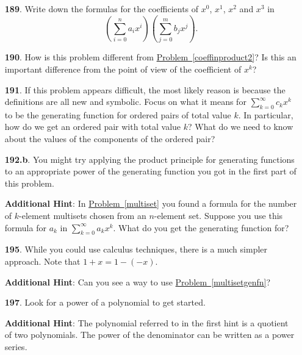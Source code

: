 \documentclass[10pt,]{book}
\theoremstyle{plain}
\theoremstyle{definition}
\theoremstyle{definition}
\numberwithin{equation}{chapter}
\begin{document}
\begin{itemize}[itemsep=1em]
\item[\textbf{189}.]Write down the formulas for the coefficients of \(x^0\), \(x^1\), \(x^2\) and \(x^3\) in%
\begin{equation*}
\left(\sum_{i=0}^n a_ix^i\right)\left(\sum_{j=0}^m b_jx^j\right)\text{.}
\end{equation*}
%

\item[\textbf{190}.]How is this problem different from \hyperref[coeffinproduct2]{Problem~\ref{coeffinproduct2}}? Is this an important difference from the point of view of the coefficient of \(x^k\)?%

\item[\textbf{191}.]If this problem appears difficult, the most likely reason is because the definitions are all new and symbolic. Focus on what it means for \(\sum_{k=0}^\infty c_kx^k\) to be the generating function for ordered pairs of total value \(k\). In particular, how do we get an ordered pair with total value \(k\)? What do we need to know about the values of the components of the ordered pair?%

\item[\textbf{192.b}.]You might try applying the product principle for generating functions to an appropriate power of the generating function you got in the first part of this problem.%

\par\smallskip
\noindent\textbf{Additional Hint}: In \hyperref[multiset]{Problem~\ref{multiset}} you found a formula for the number of \(k\)-element multisets chosen from an \(n\)-element set. Suppose you use this formula for \(a_k\) in \(\sum_{k=0}^\infty a_kx^k\). What do you get the generating function for?%

\item[\textbf{195}.]While you could use calculus techniques, there is a much simpler approach. Note that \(1 + x = 1 - (-x)\).%

\par\smallskip
\noindent\textbf{Additional Hint}: Can you see a way to use \hyperref[multisetgenfn]{Problem~\ref{multisetgenfn}}?%

\item[\textbf{197}.]Look for a power of a polynomial to get started.%

\par\smallskip
\noindent\textbf{Additional Hint}: The polynomial referred to in the first hint is a quotient of two polynomials.  The power of the denominator can be written as a power series.%


\end{itemize}
\end{document}
